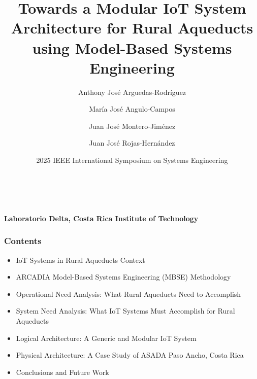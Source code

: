 \documentclass[aspectratio=169]{beamer}
\title[IoT for Rural Aqueducts using MBSE]{Towards a Modular IoT System Architecture for Rural Aqueducts using Model-Based Systems Engineering}
\author[Laboratorio Delta]{Anthony José Arguedas-Rodríguez \and María José Angulo-Campos \and Juan José Montero-Jiménez \and Juan José Rojas-Hernández}
\date{2025 IEEE International Symposium on Systems Engineering}
\begin{document}
\begin{frame}
    \begin{center}
        {\LARGE \textbf{\inserttitle}} \\
        \vspace{0.5cm}
        {\insertauthor} \\
        \vspace{0.25cm}
        {\small \textbf{Laboratorio Delta, Costa Rica Institute of Technology}} \\
        \vspace{0.5cm}
        {\insertdate}
    \end{center}
\end{frame}

\begin{frame}
    \frametitle{Contents}
    \begin{itemize}
        \item IoT Systems in Rural Aqueducts Context
        \item ARCADIA Model-Based Systems Engineering (MBSE) Methodology
        \item Operational Need Analysis: What Rural Aqueducts Need to Accomplish
        \item System Need Analysis: What IoT Systems Must Accomplish for Rural Aqueducts
        \item Logical Architecture: A Generic and Modular IoT System
        \item Physical Architecture: A Case Study of ASADA Paso Ancho, Costa Rica
        \item Conclusions and Future Work
    \end{itemize}
\end{frame}
\end{document}
